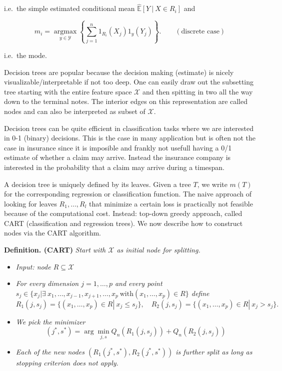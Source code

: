 \documentclass[
]{book}
\providecommand{\tightlist}{%
  \setlength{\itemsep}{0pt}\setlength{\parskip}{0pt}}
\begin{document}
i.e.~the simple estimated conditional mean \(\mathbb {\hat E}[Y\ \vert\ X\in R_i]\) and

\[
m_i=\underset{y\in \mathcal Y}{\operatorname{argmax}}\left\{\sum_{j=1}^n1_{R_i}(X_j)1_{y}(Y_j)\right\}.\qquad (\text{discrete case})
\]

i.e.~the mode.

Decision trees are popular because the decision making (estimate) is nicely visualizable/interpretable if not too deep. One can easily draw out the subsetting tree starting with the entire feature space \(\mathcal X\) and then spitting in two all the way down to the terminal notes. The interior edges on this representation are called nodes and can also be interpreted as subset of \(\mathcal X\).

Decision trees can be quite efficient in classification tasks where we are interested in 0-1 (binary) decisions. This is the case in many application but is often not the case in insurance since it is imposible and frankly not usefull having a 0/1 estimate of whether a claim may arrive. Instead the insurance company is interested in the probability that a claim may arrive during a timespan.

A decision tree is uniquely defined by its leaves. Given a tree \(T\), we write \(m(T)\) for the corresponding regression or classification function. The naive approach of looking for leaves \(R_1,\dots, R_l\) that minimize a certain loss is practically not feasible because of the computational cost. Instead: top-down greedy approach, called CART (classification and regression trees). We now describe how to construct nodes via the CART algorithm.

\textbf{Definition. (CART)} \emph{Start with \(\mathcal X\) as initial node for splitting.}

\begin{itemize}
\tightlist
\item
  \emph{Input: node \(R\subseteq \mathcal X\) }
\item
  \emph{For every dimension \(j=1,\dots,p\) and every point \(s_j\in \{x_j| \exists\ x_1,\dots,x_{j-1},x_{j+1},\dots,x_p\ \text{with} (x_1,\dots,x_p)\in R\}\) define}
  \[R_1(j,s_j)=\{(x_1,\dots,x_p)\in R| \ x_j \leq s_j\}, \quad R_2(j,s_j)=\{(x_1,\dots,x_p)\in R| \ x_j > s_j\}.\]
\item
  \emph{We pick the minimizer}
  \[(j^\ast,s^\ast)= \arg\min_{j,s} Q_n(R_1(j,s_j)) + Q_n(R_2(j,s_j))\]
\item
  \emph{Each of the new nodes \((R_1(j^\ast,s^\ast),R_2(j^\ast,s^\ast))\) is further split as long as stopping criterion does not apply.}
\end{itemize}
\end{document}
